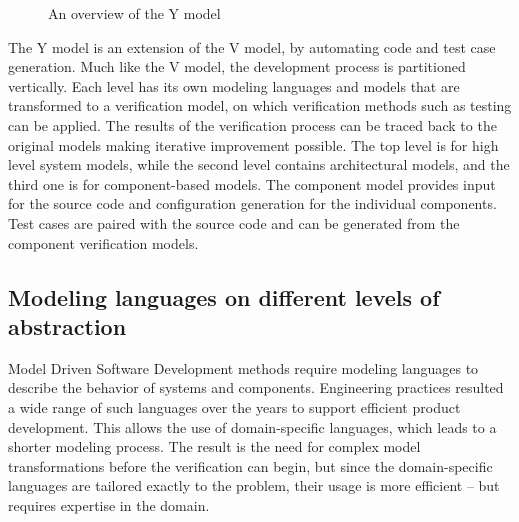 \begin{figure}
	\caption{An overview of the Y model}
	\label{fig:intro:ymodel}
\end{figure}

The Y model\citep{ymodel} is an extension of the V model\citep{randomwikipedialink3}, by automating code and test case generation. Much like the V model, the development process is partitioned vertically. Each level has its own modeling languages and models that are transformed to a verification model, on which verification methods such as testing can be applied. The results of the verification process can be traced back to the original models making iterative improvement possible. The top level is for high level system models, while the second level contains architectural models, and the third one is for component-based models. The component model provides input for the source code and configuration generation for the individual components. Test cases are paired with the source code and can be generated from the component verification models.


\subsection{Modeling languages on different levels of abstraction}

Model Driven Software Development methods require modeling languages to describe the behavior of systems and components. Engineering practices resulted a wide range of such languages over the years to support efficient product development. This allows the use of domain-specific languages, which leads to a shorter modeling process. The result is the need for complex model transformations before the verification can begin,
but since the domain-specific languages are tailored exactly to the problem, their usage is more efficient -- but requires expertise in the domain.  

